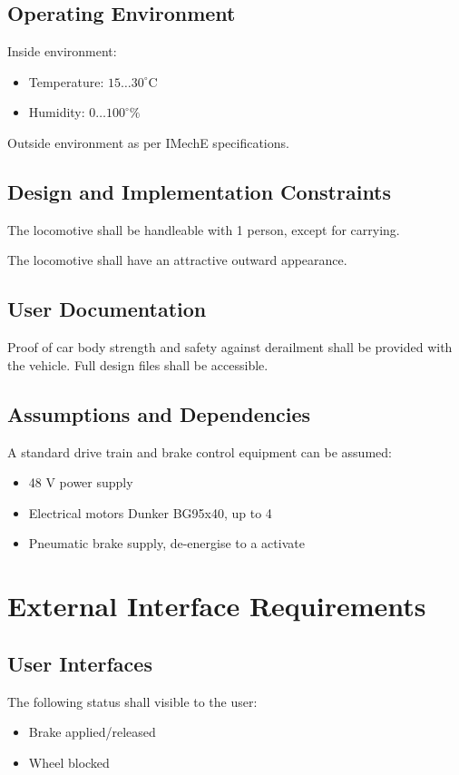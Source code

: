 \documentclass{scrreprt}
\begin{document}
\section{Operating Environment}
Inside environment:
\begin{itemize}
	\item Temperature: $15\ldots30^\circ\mathrm{C}$
	\item Humidity: $0\ldots100^\circ\mathrm{\%}$
\end{itemize}

Outside environment as per IMechE specifications.

\section{Design and Implementation Constraints}
The locomotive shall be handleable with 1 person, except for carrying.

The locomotive shall have an attractive outward appearance.

\section{User Documentation}
Proof of car body strength and safety against derailment shall be provided with the vehicle. Full design files shall be accessible.
 
\section{Assumptions and Dependencies}
A standard drive train and brake control equipment can be assumed:
\begin{itemize}
		\item 48 V power supply
		\item Electrical motors Dunker BG95x40, up to 4
		\item Pneumatic brake supply, de-energise to a activate
		\end{itemize}

\chapter{External Interface Requirements}
\section{User Interfaces}
The following status shall visible to the user:
\begin{itemize}
	\item Brake applied/released
	\item Wheel blocked
\end{itemize}
\end{document}
